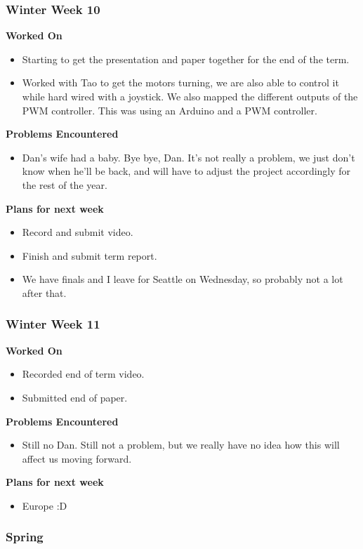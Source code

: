 \documentclass[compsoc,draftclsnofoot,onecolumn,10pt]{IEEEtran}
\begin{document}
\subsubsection*{Winter Week 10}
\textbf{Worked On}
\begin{itemize}
    \item Starting to get the presentation and paper together for the end of the term. 
    \item Worked with Tao to get the motors turning, we are also able to control it while hard wired with a joystick. We also mapped the different outputs of the PWM controller. This was using an Arduino and a PWM controller.
\end{itemize}
\textbf{Problems Encountered}
\begin{itemize}
    \item Dan's wife had a baby. Bye bye, Dan. It's not really a problem, we just don't know when he'll be back, and will have to adjust the project accordingly for the rest of the year. 
\end{itemize}
\textbf{Plans for next week}
\begin{itemize}
    \item Record and submit video.
    \item Finish and submit term report.
    \item We have finals and I leave for Seattle on Wednesday, so probably not a lot after that.
\end{itemize}


\subsubsection*{Winter Week 11}
\textbf{Worked On}
\begin{itemize}
    \item Recorded end of term video.
    \item Submitted end of paper. 
\end{itemize}
\textbf{Problems Encountered}
\begin{itemize}
    \item Still no Dan. Still not a problem, but we really have no idea how this will affect us moving forward. 
\end{itemize}
\textbf{Plans for next week}
\begin{itemize}
    \item Europe :D
\end{itemize}


\subsubsection{Spring}
\end{document}

